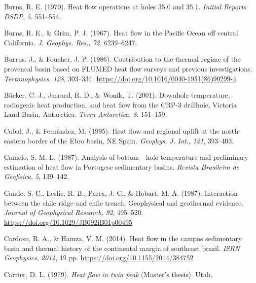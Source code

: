 \documentclass[draft,linenumbers]{agujournal2018}
\begin{document}
\leavevmode{}%
Burns, R. E. (1970). Heat flow operations at holes 35.0 and 35.1.
\emph{Initial Reports DSDP}, \emph{5}, 551--554.

\leavevmode{}%
Burns, R. E., \& Grim, P. J. (1967). Heat flow in the {Pacific Ocean}
off central {California}. \emph{J. Geophys. Res.}, \emph{72},
6239--6247.

\leavevmode{}%
Burrus, J., \& Foucher, J. P. (1986). Contribution to the thermal regime
of the provencal basin based on FLUMED heat flow surveys and previous
investigations. \emph{Tectonophysics}, \emph{128}, 303--334.
\url{https://doi.org/10.1016/0040-1951(86)90299-4}

\leavevmode{}%
Bücker, C. J., Jarrard, R. D., \& Wonik, T. (2001). Downhole
temperature, radiogenic heat production, and heat flow from the {CRP-3}
drillhole, {Victoria Land Basin, Antarctica}. \emph{Terra Antarctica},
\emph{8}, 151--159.

\leavevmode{}%
Cabal, J., \& Fernàndez, M. (1995). Heat flow and regional uplift at the
north-eastern border of the {Ebro basin, NE Spain}. \emph{Geophys. J.
Int.}, \emph{121}, 393--403.

\leavevmode{}%
Camelo, S. M. L. (1987). Analysis of bottom---hole temperature and
preliminary estimation of heat flow in {Portugese} sedimentary basins.
\emph{Revista Brasileira de Geofisica}, \emph{5}, 139--142.

\leavevmode{}%
Cande, S. C., Leslie, R. B., Parra, J. C., \& Hobart, M. A. (1987).
Interaction between the chile ridge and chile trench: Geophysical and
geothermal evidence. \emph{Journal of Geophysical Research}, \emph{92},
495--520. \url{https://doi.org/10.1029/JB092iB01p00495}

\leavevmode{}%
Cardoso, R. A., \& Hamza, V. M. (2014). Heat flow in the campos
sedimentary basin and thermal history of the continental margin of
southeast brazil. \emph{ISRN Geophysics}, \emph{2014}, 19 pp.
\url{https://doi.org/10.1155/2014/384752}

\leavevmode{}%
Carrier, D. L. (1979). \emph{Heat flow in twin peak} (Master's thesis).
Utah.
\end{document}
